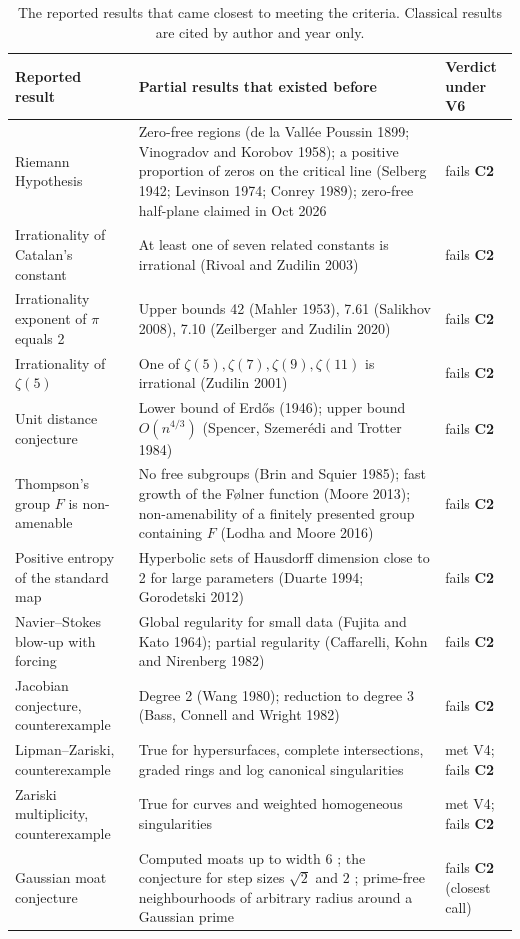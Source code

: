 \documentclass[11pt,a4paper]{article}
\theoremstyle{prob}
\newcommand{\Ctwo}{\textbf{C2}}
\begin{document}
\begin{table}[!htb]
\centering\footnotesize
\begin{tabularx}{\textwidth}{L{3.9cm} Y L{2.5cm}}
\toprule
Reported result & Partial results that existed before & Verdict under V6\\
\midrule
Riemann Hypothesis \cite{rhscience} & Zero-free regions (de la Vall\'ee Poussin 1899; Vinogradov and Korobov 1958); a positive proportion of zeros on the critical line (Selberg 1942; Levinson 1974; Conrey 1989); zero-free half-plane claimed in Oct 2026 & fails \Ctwo\\
Irrationality of Catalan's constant \cite{openairepo} & At least one of seven related constants is irrational (Rivoal and Zudilin 2003) & fails \Ctwo\\
Irrationality exponent of $\pi$ equals 2 \cite{openairepo} & Upper bounds 42 (Mahler 1953), 7.61 (Salikhov 2008), 7.10 (Zeilberger and Zudilin 2020) & fails \Ctwo\\
Irrationality of $\zeta(5)$ \cite{fmapery} & One of $\zeta(5),\zeta(7),\zeta(9),\zeta(11)$ is irrational (Zudilin 2001) & fails \Ctwo\\
Unit distance conjecture \cite{udopenai} & Lower bound of Erd\H{o}s (1946); upper bound $O(n^{4/3})$ (Spencer, Szemer\'edi and Trotter 1984) & fails \Ctwo\\
Thompson's group $F$ is non-amenable \cite{openairepo,kimlodha} & No free subgroups (Brin and Squier 1985); fast growth of the F\o lner function (Moore 2013); non-amenability of a finitely presented group containing $F$ (Lodha and Moore 2016) & fails \Ctwo\\
Positive entropy of the standard map \cite{openairepo} & Hyperbolic sets of Hausdorff dimension close to 2 for large parameters (Duarte 1994; Gorodetski 2012) & fails \Ctwo\\
Navier--Stokes blow-up with forcing \cite{nsopenai} & Global regularity for small data (Fujita and Kato 1964); partial regularity (Caffarelli, Kohn and Nirenberg 1982) & fails \Ctwo\\
Jacobian conjecture, counterexample \cite{fme} & Degree 2 (Wang 1980); reduction to degree 3 (Bass, Connell and Wright 1982) & fails \Ctwo\\
Lipman--Zariski, counterexample \cite{openairepo} & True for hypersurfaces, complete intersections, graded rings and log canonical singularities \cite{graf,hochster} & met V4; fails \Ctwo\\
Zariski multiplicity, counterexample \cite{openairepo} & True for curves and weighted homogeneous singularities \cite{greuel} & met V4; fails \Ctwo\\
Gaussian moat conjecture \cite{openairepo} & Computed moats up to width 6 \cite{tsuchimura}; the conjecture for step sizes $\sqrt2$ and $2$ \cite{gethnerstark}; prime-free neighbourhoods of arbitrary radius around a Gaussian prime & fails \Ctwo{} (closest call)\\
\bottomrule
\end{tabularx}
\caption{The reported results that came closest to meeting the criteria. Classical results are cited by author and year only.}\label{tab:hard}
\end{table}
\end{document}
